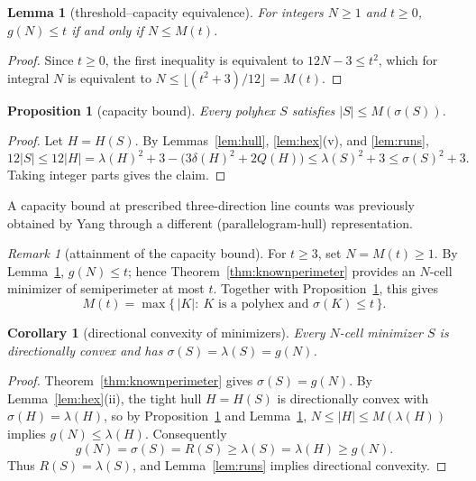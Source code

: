 \documentclass[11pt]{article}
\theoremstyle{plain}
\newtheorem{lemma}[theorem]{Lemma}
\newtheorem{proposition}[theorem]{Proposition}
\newtheorem{corollary}[theorem]{Corollary}
\theoremstyle{definition}
\theoremstyle{remark}
\newtheorem{remark}[theorem]{Remark}
\begin{document}
\begin{lemma}[threshold--capacity equivalence]\label{lem:cap-equiv}
For integers \(N\ge1\) and \(t\ge0\), \(g(N)\le t\) if and only if \(N\le M(t)\).
\end{lemma}
\begin{proof}
Since \(t\ge0\), the first inequality is equivalent to \(12N-3\le t^2\),
which for integral \(N\) is equivalent to
\(N\le\lfloor(t^2+3)/12\rfloor=M(t)\).
\end{proof}

\begin{proposition}[capacity bound]\label{pro:capacity-bound}
Every polyhex \(S\) satisfies \(|S|\le M(\sigma(S))\).
\end{proposition}
\begin{proof}
Let \(H=H(S)\). By Lemmas~\ref{lem:hull}, \ref{lem:hex}(v),
and \ref{lem:runs},
\[
12|S|\le12|H|
=\lambda(H)^2+3-\bigl(3\delta(H)^2+2Q(H)\bigr)
\le\lambda(S)^2+3\le\sigma(S)^2+3 .
\]
Taking integer parts gives the claim.
\end{proof}
\noindent A capacity bound at prescribed three-direction line counts was
previously obtained by Yang \cite[Theorem~7]{Yang2002} through a different
(parallelogram-hull) representation.


\begin{remark}[attainment of the capacity bound]
For \(t\ge3\), set \(N=M(t)\ge1\). By Lemma~\ref{lem:cap-equiv},
\(g(N)\le t\); hence Theorem~\ref{thm:knownperimeter} provides an
\(N\)-cell minimizer of semiperimeter at most \(t\).
Together with Proposition~\ref{pro:capacity-bound}, this gives
\[
M(t)=\max\{\,|K|:\ K\text{ is a polyhex and }\sigma(K)\le t\,\}.
\]
\end{remark}

\begin{corollary}[directional convexity of minimizers]\label{cor:capacity-directional}
Every \(N\)-cell minimizer \(S\) is directionally convex and has
\(\sigma(S)=\lambda(S)=g(N)\).
\end{corollary}
\begin{proof}
Theorem~\ref{thm:knownperimeter} gives \(\sigma(S)=g(N)\).
By Lemma~\ref{lem:hex}(ii), the tight hull \(H=H(S)\) is directionally
convex with \(\sigma(H)=\lambda(H)\), so by
Proposition~\ref{pro:capacity-bound} and Lemma~\ref{lem:cap-equiv},
\(N\le|H|\le M(\lambda(H))\) implies \(g(N)\le\lambda(H)\).
Consequently
\[
g(N)=\sigma(S)=R(S)\ge\lambda(S)=\lambda(H)\ge g(N).
\]
Thus \(R(S)=\lambda(S)\), and Lemma~\ref{lem:runs}
implies directional convexity.
\end{proof}
\end{document}
